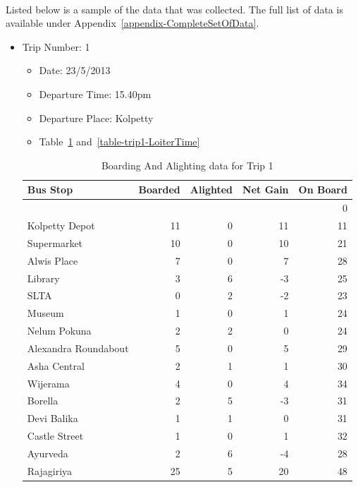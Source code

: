 \paragraph{ } Listed below is a sample of the data that was collected. The full list of data is available under Appendix~\ref{appendix-CompleteSetOfData}.

\begin{itemize}

\item Trip Number: 1
\begin{itemize}
\item Date: 23/5/2013
\item Departure Time: 15.40pm
\item Departure Place: Kolpetty
\item Table~\ref{table-trip1-BoardingAndAlighting} and~\ref{table-trip1-LoiterTime}
\end{itemize}
\begin{table}[h!]
\centering
\begin{tabular}{|l|r|r|r|r|}
\hline
Bus Stop & Boarded & Alighted & Net Gain & On Board \\
\hline
 & & & & 0 \\
Kolpetty Depot	&11	&0	&11	&11\\
Supermarket	&10	&0	&10	&21\\
Alwis Place	&7	&0	&7	&28\\
Library	&3	&6	&-3	&25\\
SLTA	&0	&2	&-2	&23\\
\rowcolor[gray]{0.7}
Museum	&1	&0	&1	&24\\
Nelum Pokuna	&2	&2	&0	&24\\
\rowcolor[gray]{0.7}
Alexandra Roundabout	&5	&0	&5	&29\\
Asha Central	&2	&1	&1	&30\\
Wijerama	&4	&0	&4	&34\\
Borella	&2	&5	&-3	&31\\
Devi Balika	&1	&1	&0	&31\\
Castle Street	&1	&0	&1	&32\\
Ayurveda	&2	&6	&-4	&28\\
Rajagiriya	&25	&5	&20	&48\\
\hline
\end{tabular}
\caption{Boarding And Alighting data for Trip 1}
\label{table-trip1-BoardingAndAlighting}
\end{table}


\end{itemize}
